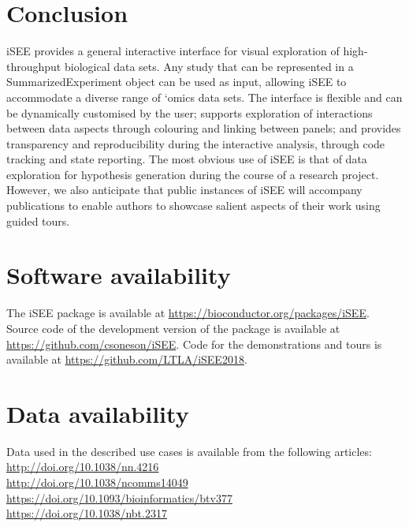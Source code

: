 \documentclass[10pt,a4paper,twocolumn]{article}
\begin{document}
\section*{Conclusion}
iSEE provides a general interactive interface for visual exploration of high-throughput biological data sets.
Any study that can be represented in a SummarizedExperiment object can be used as input, allowing iSEE to accommodate a diverse range of `omics data sets.
The interface is flexible and can be dynamically customised by the user; supports exploration of interactions between data aspects through colouring and linking between panels;
and provides transparency and reproducibility during the interactive analysis, through code tracking and state reporting. 
The most obvious use of iSEE is that of data exploration for hypothesis generation during the course of a research project.
However, we also anticipate that public instances of iSEE will accompany publications to enable authors to showcase salient aspects of their work using guided tours.

\section*{Software availability}
% 
% 
The iSEE package is available at \url{https://bioconductor.org/packages/iSEE}.
Source code of the development version of the package is available at \url{https://github.com/csoneson/iSEE}.
Code for the demonstrations and tours is available at \url{https://github.com/LTLA/iSEE2018}.
% 
% 
\section*{Data availability }

Data used in the described use cases is available from the following articles: \\
\url{http://doi.org/10.1038/nn.4216}\citep{tasic2016allen} \\
\url{http://doi.org/10.1038/ncomms14049}\citep{zheng2017massively} \\
\url{https://doi.org/10.1093/bioinformatics/btv377}\citep{piccolo2015TCGA} \\
\url{https://doi.org/10.1038/nbt.2317}\citep{bodenmiller2012cytof} \\
\end{document}
